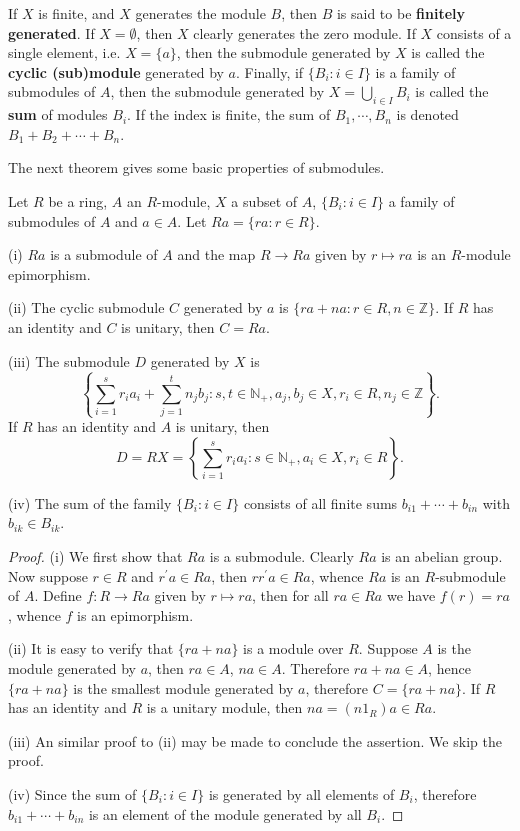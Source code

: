 If $X$ is finite, and $X$ generates the module $B$, then $B$ is said to be \textbf{finitely generated}. If $X=\emptyset$, then $X$ clearly generates the zero module. If $X$ consists of a single element, i.e. $X=\{a\}$, then the submodule generated by $X$ is called the \textbf{cyclic (sub)module} generated by $a$. Finally, if $\{B_i:i\in I\}$ is a family of submodules of $A$, then the submodule generated by $X=\bigcup_{i\in I}B_i$ is called the \textbf{sum} of modules $B_i$. If the index is finite, the sum of $B_1,\cdots,B_n$ is denoted $B_1+B_2+\cdots+B_n$.\par
The next theorem gives some basic properties of submodules.
\begin{theorem}
Let $R$ be a ring, $A$ an $R$-module, $X$ a subset of $A$, $\{B_i:i\in I\}$ a family of submodules of $A$ and $a\in A$. Let $Ra=\{ra:r\in R\}$.\par
(i) $Ra$ is a submodule of $A$ and the map $R\to Ra$ given by $r\mapsto ra$ is an $R$-module epimorphism.\par
(ii) The cyclic submodule $C$ generated by $a$ is $\{ra+na:r\in R,n\in\mathbb{Z}\}$. If $R$ has an identity and $C$ is unitary, then $C=Ra$.\par
(iii) The submodule $D$ generated by $X$ is 
$$
\left\{ \sum_{i=1}^s{r_ia_i}+\sum_{j=1}^t{n_jb_j}:s,t\in \mathbb{N} _+,a_j,b_j\in X,r_i\in R,n_j\in \mathbb{Z} \right\} .
$$
If $R$ has an identity and $A$ is unitary, then 
$$
D=RX=\left\{ \sum_{i=1}^s{r_ia_i}:s\in \mathbb{N} _+,a_i\in X,r_i\in R \right\} .
$$\par
(iv) The sum of the family $\{B_i:i\in I\}$ consists of all finite sums $b_{i1}+\cdots+b_{in}$ with $b_{ik}\in B_{ik}$.
\end{theorem}
\begin{proof}
(i) We first show that $Ra$ is a submodule. Clearly $Ra$ is an abelian group. Now suppose $r\in R$ and $r^\prime a\in Ra$, then $rr^\prime a\in Ra$, whence $Ra$ is an $R$-submodule of $A$. Define $f:R\to Ra$ given by $r\mapsto ra$, then for all $ra\in Ra$ we have $f(r)=ra$, whence $f$ is an epimorphism.\par
(ii) It is easy to verify that $\{ra+na\}$ is a module over $R$. Suppose $A$ is the module generated by $a$, then $ra\in A$, $na\in A$. Therefore $ra+na\in A$, hence $\{ra+na\}$ is the smallest module generated by $a$, therefore $C=\{ra+na\}$. If $R$ has an identity and $R$ is a unitary module, then $na=(n1_R)a\in Ra$.\par
(iii) An similar proof to (ii) may be made to conclude the assertion. We skip the proof.\par
(iv) Since the sum of $\{B_i:i\in I\}$ is generated by all elements of $B_i$, therefore $b_{i1}+\cdots+b_{in}$ is an element of the module generated by all $B_i$.
\end{proof}

